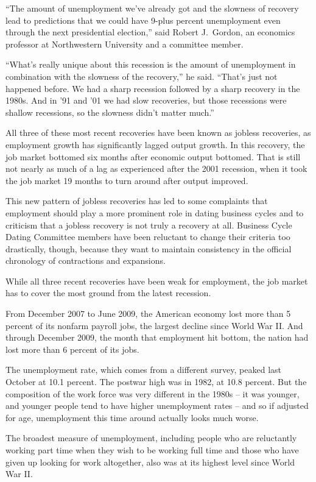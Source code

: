 ﻿\documentclass[12pt]{article}
\begin{document}
``The amount of unemployment we've already got and the slowness of recovery lead to predictions that
we could have 9-plus percent unemployment even through the next presidential election,'' said Robert
J.~Gordon, an economics professor at Northwestern University and a committee member.

``What's really unique about this recession is the amount of unemployment in combination with the
slowness of the recovery,'' he said. ``That's just not happened before. We had a sharp recession
followed by a sharp recovery in the 1980s. And in '91 and '01 we had slow recoveries, but those
recessions were shallow recessions, so the slowness didn't matter much.''

All three of these most recent recoveries have been known as jobless recoveries, as employment
growth has significantly lagged output growth. In this recovery, the job market bottomed six months
after economic output bottomed. That is still not nearly as much of a lag as experienced after the
2001 recession, when it took the job market 19 months to turn around after output improved.

This new pattern of jobless recoveries has led to some complaints that employment should play a more
prominent role in dating business cycles and to criticism that a jobless recovery is not truly a
recovery at all. Business Cycle Dating Committee members have been reluctant to change their
criteria too drastically, though, because they want to maintain consistency in the official
chronology of contractions and expansions.

While all three recent recoveries have been weak for employment, the job market has to cover the
most ground from the latest recession.

From December 2007 to June 2009, the American economy lost more than 5 percent of its nonfarm
payroll jobs, the largest decline since World War II. And through December 2009, the month that
employment hit bottom, the nation had lost more than 6 percent of its jobs.

The unemployment rate, which comes from a different survey, peaked last October at 10.1 percent. The
postwar high was in 1982, at 10.8 percent. But the composition of the work force was very different
in the 1980s -- it was younger, and younger people tend to have higher unemployment rates -- and so
if adjusted for age, unemployment this time around actually looks much worse.

The broadest measure of unemployment, including people who are reluctantly working part time when
they wish to be working full time and those who have given up looking for work altogether, also was
at its highest level since World War II.
\end{document}

